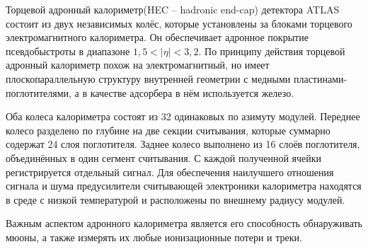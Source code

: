 Торцевой адронный калориметр(HEC -- hadronic end-cap) детектора ATLAS состоит из двух независимых колёс, которые установлены за блоками торцевого электромагнитного калориметра. Он обеспечивает адронное покрытие псевдобыстроты в диапазоне $1,5 < |\eta| < 3,2$. По принципу действия торцевой адронный калориметр похож на электромагнитный, но имеет плоскопараллельную структуру внутренней геометрии с медными пластинами-поглотителями, а в качестве адсорбера в нём используется железо.\par
Оба колеса калориметра состоят из 32 одинаковых по азимуту модулей. Переднее колесо разделено по глубине на две секции считывания, которые суммарно содержат 24 слоя поглотителя. Заднее колесо выполнено из 16 слоёв поглотителя, объединённых в один сегмент считывания. С каждой полученной ячейки регистрируется отдельный сигнал. Для обеспечения наилучшего отношения сигнала и шума предусилители считывающей электроники калориметра находятся в среде с низкой температурой и расположены по внешнему радиусу модулей.\par
Важным аспектом адронного калориметра является его способность обнаруживать мюоны, а также измерять их любые ионизационные потери и треки.\par
